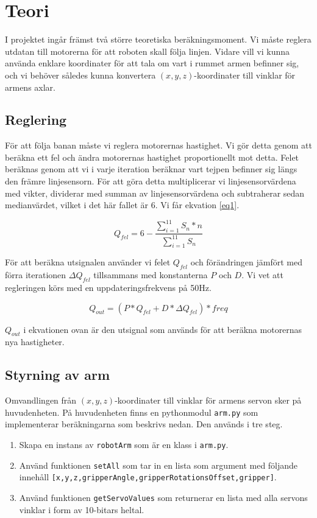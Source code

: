 \section{Teori}
I projektet ingår främst två större teoretiska beräkningsmoment. Vi måste reglera utdatan till motorerna för att roboten skall följa linjen. Vidare vill vi kunna använda enklare koordinater för att tala om vart i rummet armen befinner sig, och vi behöver således kunna konvertera $(x,y,z)$-koordinater till vinklar för armens axlar.

\subsection{Reglering}
För att följa banan måste vi reglera motorernas hastighet. Vi gör detta genom att beräkna ett fel och ändra motorernas hastighet proportionellt mot detta. Felet beräknas genom att vi i varje iteration beräknar vart tejpen befinner sig längs den främre linjesensorn. För att göra detta multiplicerar vi linjesensorvärdena med vikter, dividerar med summan av linjesensorvärdena och subtraherar sedan medianvärdet, vilket i det här fallet är $6$. Vi får ekvation \ref{eq1}.

\begin{equation} \label{eq1}
	Q_{fel}=6-\frac{\sum_{i=1}^{11}S_{n}*n}{\sum_{i=1}^{11}S_n}
\end{equation}

För att beräkna utsignalen använder vi felet $Q_{fel}$ och förändringen jämfört med förra iterationen ${\Delta}Q_{fel}$ tillsammans med konstanterna $P$ och $D$. Vi vet att regleringen körs med en uppdateringsfrekvens på 50Hz.

\begin{equation} \label{eq2}
	Q_{out}=(P*Q_{fel}+D*{\Delta}Q_{fel})*freq
\end{equation}

$Q_{out}$ i ekvationen ovan är den utsignal som används för att beräkna motorernas nya hastigheter.

\subsection{Styrning av arm}
Omvandlingen från $(x,y,z)$-koordinater till vinklar för armens servon sker på huvudenheten. På huvudenheten finns en pythonmodul \texttt{arm.py} som implementerar beräkningarna som beskrivs nedan. Den används i tre steg.
\begin{enumerate}
	\item Skapa en instans av \texttt{robotArm} som är en klass i \texttt{arm.py}.
	\item Använd funktionen \texttt{setAll} som tar in en lista som argument med följande innehåll \newline \texttt{[x,y,z,gripperAngle,gripperRotationsOffset,gripper]}.
	\item Använd funktionen \texttt{getServoValues} som returnerar en lista med alla servons vinklar i form av 10-bitars heltal.
\end{enumerate}


